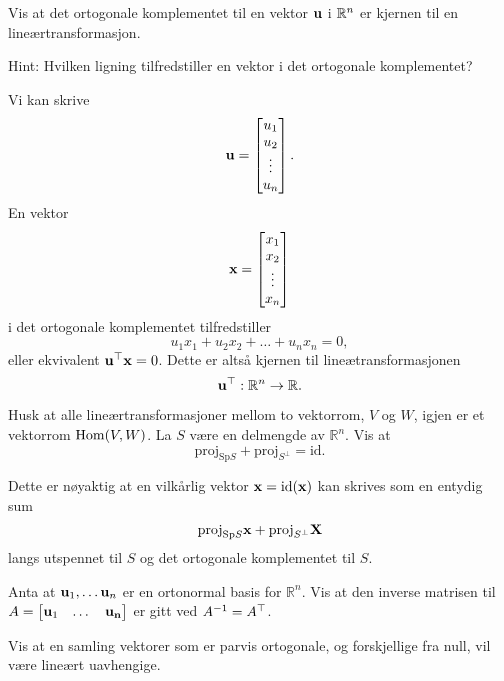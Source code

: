 \begin{oppgave}
Vis at det ortogonale komplementet til en vektor $\mathbf{u}$ i $\mathbb{R}^n$
er kjernen til en lineærtransformasjon.

\noindent
Hint: Hvilken ligning tilfredstiller en vektor i det ortogonale komplementet?

\end{oppgave}

\begin{losning}
Vi kan skrive
\[
\mathbf{u}=\begin{bmatrix}
u_1\\
u_2\\
\vdots\\
u_n\\
\end{bmatrix}.
\]
En vektor
\[
\mathbf{x}=\begin{bmatrix}
x_1\\
x_2\\
\vdots\\
x_n\\
\end{bmatrix}
\]
i det ortogonale komplementet tilfredstiller
\[
u_1x_1+u_2x_2+\dots +u_nx_n=0,
\]
eller ekvivalent $\mathbf{u}^\top \mathbf{x}=0$.
Dette er altså kjernen til lineætransformasjonen
\[
\mathbf{u}^\top:\mathbb{R}^n\rightarrow \mathbb{R}.
\]
\end{losning}


\begin{oppgave}
Husk at alle lineærtransformasjoner mellom to vektorrom, $V$ og $W$, igjen er et vektorrom $\operatorname{Hom}(V,W)$. La $S$ være en delmengde av $\mathbb{R}^n$. Vis at $$\text{proj}_{\text{Sp}S}+\text{proj}_{S^{\perp}}=\text{id}.$$
\end{oppgave}

\begin{losning}
Dette er nøyaktig at en vilkårlig vektor $\mathbf{x}=\text{id}(\mathbf{x})$ kan skrives som en entydig sum $$\text{proj}_{\text{Sp}S}\mathbf{x}+\text{proj}_{S^{\perp}}\mathbf{X}$$ langs utspennet til $S$ og det ortogonale komplementet til $S$.
\end{losning}


\begin{oppgave}
\begin{punkt}
Anta at $\mathbf{u}_1,\dots \mathbf{u}_n$ er en ortonormal basis for $\mathbb{R}^n$. Vis at den inverse matrisen til $A=\begin{bmatrix}
\mathbf{u}_1 & \dots & \mathbf{u_n}
\end{bmatrix}$ er gitt ved $A^{-1}=A^\top$.
\end{punkt}
\begin{punkt}
Vis at en samling vektorer som er parvis ortogonale, og forskjellige fra null, vil være lineært uavhengige.
\end{punkt}
\end{oppgave}




